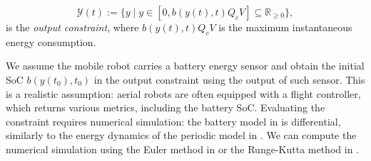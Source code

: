 \begin{defn}
  \label{def:const}
  \begin{equation*}
    \mathcal{Y}(t):=\{y\mid y\in[0,b(y(t),t)Q_cV]\subseteq{\mathbb{R}_{\geq 0}}\},
  \end{equation*}
  is the \emph{output constraint}, where $b(y(t),t)Q_cV$ is the maximum instantaneous energy consumption.
\end{defn}

We assume the mobile robot carries a battery energy sensor and obtain the initial SoC $b(y(t_0),t_0)$ in the output constraint using the output of such sensor. This is a realistic assumption: aerial robots are often equipped with a flight controller, which returns various metrics, including the battery SoC. Evaluating the constraint requires numerical simulation: the battery model in  is differential, similarly to the energy dynamics of the periodic model in . We can compute the numerical simulation using the Euler method in  or the Runge-Kutta method in . 

